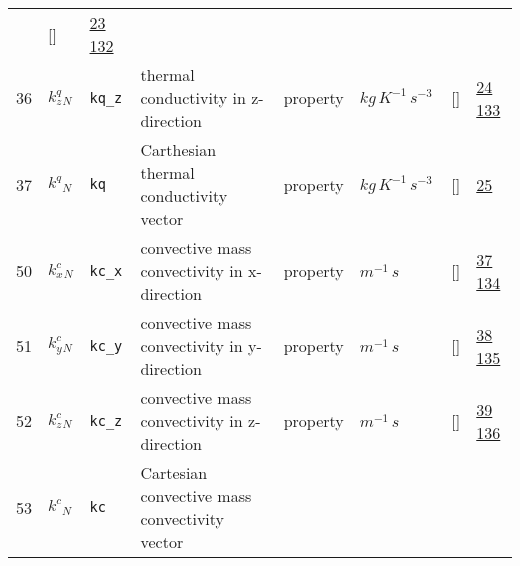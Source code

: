 \begin{longtable}{|p{1cm}|p{3cm}|p{3cm}|p{7cm}|p{3.0cm}|p{3cm}|p{2cm}|p{1cm}|}
             & []
             & \hyperlink{"e:23"}{ 23 }
                 \hyperlink{"e:132"}{ 132 }
                 \\
    36
             & \hypertarget{"v:36"}{ $ {k^q_z}{_{N}} $}
             & \verb|kq_z|
             & thermal conductivity in z-direction
             & \begin{lay}property \end{lay}
             & $ kg \,K^{-1} \,s^{-3} \, $
             & []
             & \hyperlink{"e:24"}{ 24 }
                 \hyperlink{"e:133"}{ 133 }
                 \\
    37
             & \hypertarget{"v:37"}{ $ {k^q}{_{N}} $}
             & \verb|kq|
             & Carthesian thermal conductivity vector
             & \begin{lay}property \end{lay}
             & $ kg \,K^{-1} \,s^{-3} \, $
             & []
             & \hyperlink{"e:25"}{ 25 }
                 \\
    50
             & \hypertarget{"v:50"}{ $ {k^c_x}{_{N}} $}
             & \verb|kc_x|
             & convective mass convectivity in x-direction
             & \begin{lay}property \end{lay}
             & $ m^{-1} \,s \, $
             & []
             & \hyperlink{"e:37"}{ 37 }
                 \hyperlink{"e:134"}{ 134 }
                 \\
    51
             & \hypertarget{"v:51"}{ $ {k^c_y}{_{N}} $}
             & \verb|kc_y|
             & convective mass convectivity in y-direction
             & \begin{lay}property \end{lay}
             & $ m^{-1} \,s \, $
             & []
             & \hyperlink{"e:38"}{ 38 }
                 \hyperlink{"e:135"}{ 135 }
                 \\
    52
             & \hypertarget{"v:52"}{ $ {k^c_z}{_{N}} $}
             & \verb|kc_z|
             & convective mass convectivity in z-direction
             & \begin{lay}property \end{lay}
             & $ m^{-1} \,s \, $
             & []
             & \hyperlink{"e:39"}{ 39 }
                 \hyperlink{"e:136"}{ 136 }
                 \\
    53
             & \hypertarget{"v:53"}{ $ {k^c}{_{N}} $}
             & \verb|kc|
             & Cartesian convective mass convectivity vector

\end{longtable}
